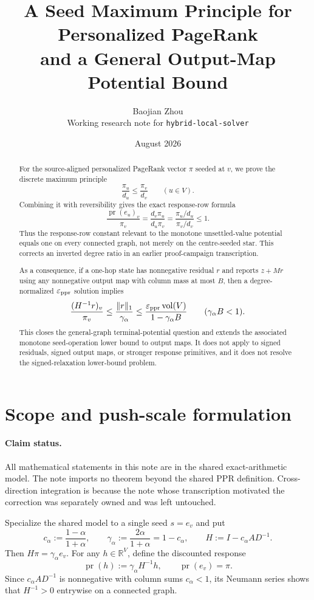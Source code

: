\documentclass[11pt]{article}
\title{A Seed Maximum Principle for Personalized PageRank\\
and a General Output-Map Potential Bound}
\author{Baojian Zhou\\
\small Working research note for \texttt{hybrid-local-solver}}
\date{August 2026}
\begin{document}
\maketitle

\begin{abstract}
For the source-aligned personalized PageRank vector $\pi$ seeded at $v$, we
prove the discrete maximum principle
\[
    \frac{\pi_u}{d_u}\le \frac{\pi_v}{d_v}
    \qquad (u\in V).
\]
Combining it with reversibility gives the exact response-row formula
\[
 \frac{\operatorname{pr}(e_u)_v}{\pi_v}
 =\frac{d_v\pi_u}{d_u\pi_v}
 =\frac{\pi_u/d_u}{\pi_v/d_v}\le1.
\]
Thus the response-row constant relevant to the monotone unsettled-value
potential equals one on every connected graph, not merely on the centre-seeded
star.  This corrects an inverted degree ratio in an earlier proof-campaign
transcription.

As a consequence, if a one-hop state has nonnegative residual $r$ and reports
$z+Mr$ using any nonnegative output map with column mass at most $B$, then a
degree-normalized $\varepsilon_{\mathrm{ppr}}$ solution implies
\[
 \frac{(H^{-1}r)_v}{\pi_v}
 \le \frac{\|r\|_1}{\gamma_{\alpha}}
 \le \frac{\varepsilon_{\mathrm{ppr}}\operatorname{vol}(V)}{1-\gamma_{\alpha} B}
 \qquad(\gamma_{\alpha} B<1).
\]
This closes the general-graph terminal-potential question and extends the
associated monotone seed-operation lower bound to output maps.  It does not
apply to signed residuals, signed output maps, or stronger response
primitives, and it does not resolve the signed-relaxation lower-bound problem.
\end{abstract}



\section{Scope and push-scale formulation}
\label{sec:seed-scope}

\paragraph{Claim status.}
All mathematical statements in this note are \statusproved{} in the shared
exact-arithmetic model.  The note imports no theorem beyond the shared PPR
definition.  Cross-direction integration is \statusopen{} because the note
whose transcription motivated the correction was separately owned and was
left untouched.

Specialize the shared model to a single seed $s=e_v$ and put
\begin{equation}
 c_{\alpha}:=\frac{1-\alpha}{1+\alpha},
 \qquad
 \gamma_{\alpha}:=\frac{2\alpha}{1+\alpha}=1-c_{\alpha},
 \qquad
 H:=I-c_{\alpha} AD^{-1}.
 \label{eq:seed-push-operator}
\end{equation}
Then $H\pi=\gamma_{\alpha} e_v$.  For any $h\in\mathbb R^V$, define the discounted
response
\begin{equation}
 \operatorname{pr}(h):=\gamma_{\alpha} H^{-1}h,
 \qquad \operatorname{pr}(e_v)=\pi.
 \label{eq:seed-response}
\end{equation}
Since $c_{\alpha} AD^{-1}$ is nonnegative with column sums $c_{\alpha}<1$, its
Neumann series shows that $H^{-1}>0$ entrywise on a connected graph.
\end{document}
